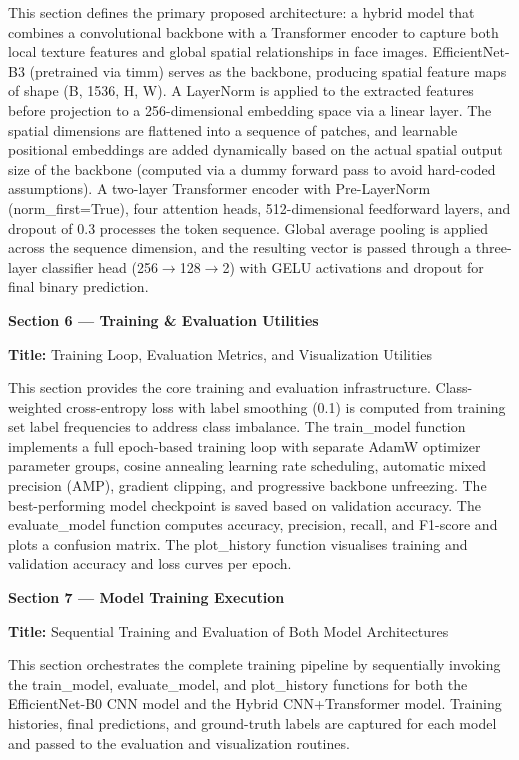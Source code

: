 \documentclass[12pt,a4paper]{report}
\begin{document}
\begin{description}
This section defines the primary proposed architecture: a hybrid model that combines a convolutional backbone with a Transformer encoder to capture both local texture features and global spatial relationships in face images. EfficientNet-B3 (pretrained via timm) serves as the backbone, producing spatial feature maps of shape (B, 1536, H, W). A LayerNorm is applied to the extracted features before projection to a 256-dimensional embedding space via a linear layer. The spatial dimensions are flattened into a sequence of patches, and learnable positional embeddings are added dynamically based on the actual spatial output size of the backbone (computed via a dummy forward pass to avoid hard-coded assumptions). A two-layer Transformer encoder with Pre-LayerNorm (norm\_first=True), four attention heads, 512-dimensional feedforward layers, and dropout of 0.3 processes the token sequence. Global average pooling is applied across the sequence dimension, and the resulting vector is passed through a three-layer classifier head (256$\rightarrow$128$\rightarrow$2) with GELU activations and dropout for final binary prediction.

\vspace{0.5cm}

\textbf{Section 6 --- Training \& Evaluation Utilities}

\textbf{Title:} Training Loop, Evaluation Metrics, and Visualization Utilities

This section provides the core training and evaluation infrastructure. Class-weighted cross-entropy loss with label smoothing (0.1) is computed from training set label frequencies to address class imbalance. The train\_model function implements a full epoch-based training loop with separate AdamW optimizer parameter groups, cosine annealing learning rate scheduling, automatic mixed precision (AMP), gradient clipping, and progressive backbone unfreezing. The best-performing model checkpoint is saved based on validation accuracy. The evaluate\_model function computes accuracy, precision, recall, and F1-score and plots a confusion matrix. The plot\_history function visualises training and validation accuracy and loss curves per epoch.

\vspace{0.5cm}

\textbf{Section 7 --- Model Training Execution}

\textbf{Title:} Sequential Training and Evaluation of Both Model Architectures

This section orchestrates the complete training pipeline by sequentially invoking the train\_model, evaluate\_model, and plot\_history functions for both the EfficientNet-B0 CNN model and the Hybrid CNN+Transformer model. Training histories, final predictions, and ground-truth labels are captured for each model and passed to the evaluation and visualization routines.


\end{description}
\end{document}
